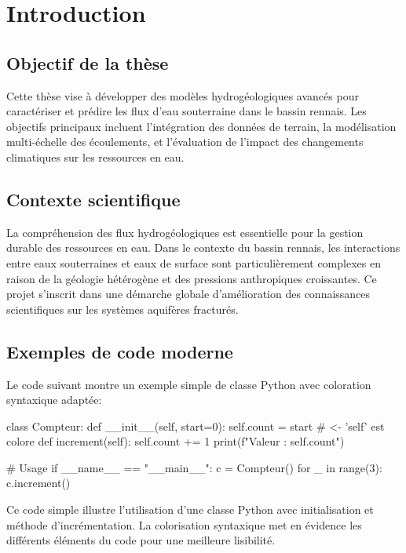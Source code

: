 \chapter{Introduction}
\minitoc %

\vspace{1cm} %

\section{Objectif de la thèse}
Cette thèse vise à développer des modèles hydrogéologiques avancés pour caractériser et prédire les flux d'eau souterraine dans le bassin rennais. Les objectifs principaux incluent l'intégration des données de terrain, la modélisation multi-échelle des écoulements, et l'évaluation de l'impact des changements climatiques sur les ressources en eau.

\section{Contexte scientifique}
La compréhension des flux hydrogéologiques est essentielle pour la gestion durable des ressources en eau. Dans le contexte du bassin rennais, les interactions entre eaux souterraines et eaux de surface sont particulièrement complexes en raison de la géologie hétérogène et des pressions anthropiques croissantes. Ce projet s'inscrit dans une démarche globale d'amélioration des connaissances scientifiques sur les systèmes aquifères fracturés.

\section{Exemples de code moderne}

Le code suivant montre un exemple simple de classe Python avec coloration syntaxique adaptée:

\begin{pythoncode}
class Compteur:
    def __init__(self, start=0):
        self.count = start        # <- 'self' est colore
    def increment(self):
        self.count += 1
        print(f"Valeur : {self.count}")

# Usage
if __name__ == "__main__":
    c = Compteur()
    for _ in range(3):
        c.increment()
\end{pythoncode}

Ce code simple illustre l'utilisation d'une classe Python avec initialisation et méthode d'incrémentation. La colorisation syntaxique met en évidence les différents éléments du code pour une meilleure lisibilité.